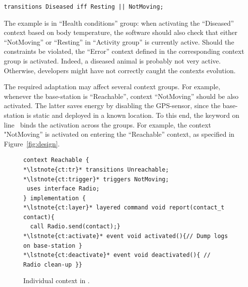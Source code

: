 \vspace{-1mm}
\begin{lstlisting}[language=conesc]
transitions Diseased iff Resting || NotMoving;
\end{lstlisting}
\vspace{-1.5mm}

The example is in ``Health conditions'' group: when activating the ``Diseased''
context based on body temperature, the software should also check that either
``NotMoving'' or ``Resting'' in ``Activity group'' is currently active. Should the
constraints be violated, the ``Error'' context defined in the corresponding
context group is activated. Indeed, a diseased animal is probably not very
active. Otherwise, developers might have not correctly caught the contexts
evolution.

The required adaptation may affect several context groups. For example, whenever
the base-station is ``Reachable'', context ``NotMoving'' should be also activated.
The latter saves energy by disabling the GPS-sensor, since the base-station is
static and deployed in a known location. To this end, the keyword
 on line~ binds the activation across the
groups. For example, the context "NotMoving'' is activated on entering the
``Reachable'' context, as specified in Figure~\ref{fig:design}.


\begin{figure}[!tb]
\begin{lstlisting}[style=conescframe]
context Reachable {
*\lstnote{ct:tr}* transitions Unreachable;
*\lstnote{ct:trigger}* triggers NotMoving;
 uses interface Radio;
} implementation {
*\lstnote{ct:layer}* layered command void report(contact_t contact){
  call Radio.send(contact);}
*\lstnote{ct:activate}* event void activated(){// Dump logs on base-station }
*\lstnote{ct:deactivate}* event void deactivated(){ // Radio clean-up }}
\end{lstlisting}
\vspace{-3mm}
\caption{Individual context in \conesc.}
  \label{fig:context}
\vspace{-7mm}
\end{figure}
